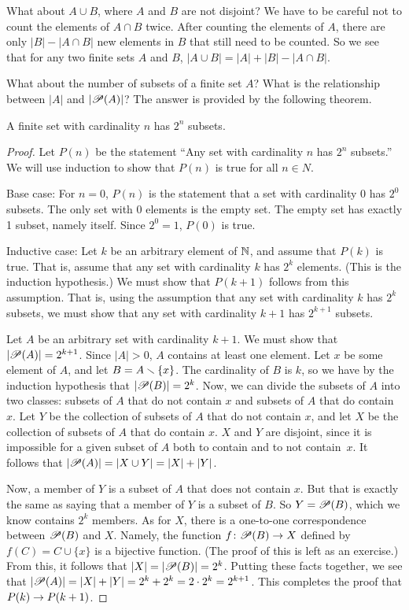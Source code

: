 What about $A\cup B$, where $A$ and $B$ are not disjoint?  We have to be
careful not to count the elements of $A\cap B$ twice.  After counting
the elements of $A$, there are only $|B|-|A\cap B|$ new elements in $B$ that
still need to be counted.  So we see that for any two finite sets $A$ and $B$,
$|A\cup B|=|A|+|B|-|A\cap B|$.

What about the number of subsets of a finite set $A$?  What is the relationship
between $|A|$ and $|{\mathscr P}(A)|$?  The answer is provided by the following theorem.

\begin{theorem}\label{T-subsetct}
A finite set with cardinality $n$  has $2^n$ subsets.
\end{theorem}
\begin{proof}
Let $P(n)$ be the statement ``Any set with cardinality $n$ has $2^n$
subsets.''  We will use induction to show that $P(n)$ is true
for all $n\in N$.

Base case:  For $n=0$, $P(n)$ is the statement that a set with
cardinality 0 has $2^0$ subsets.  The only set with 0 elements is
the empty set.  The empty set has exactly 1 subset, namely itself.
Since $2^0=1$, $P(0)$ is true.

Inductive case:  Let $k$ be an arbitrary element of ${\mathbb N}$, and
assume that $P(k)$ is true.  That is, assume that any set with
cardinality $k$ has $2^k$ elements.  (This is the induction
hypothesis.)  We must show that $P(k+1)$
follows from this assumption.  That is, using the assumption
that any set with cardinality $k$ has $2^k$ subsets, we must show that any
set with cardinality $k+1$ has $2^{k+1}$ subsets.

Let $A$ be an arbitrary set with cardinality $k+1$. 
We must show that $|{\mathscr P}(A)|=2^{k+1}$.   Since $|A|>0$,
$A$ contains at least one element.  Let $x$ be
some element of $A$, and let $B=A\smallsetminus\{x\}$.  The cardinality of
$B$ is $k$, so we have by the induction hypothesis that $|{\mathscr P}(B)|=2^k$.
Now, we can divide the subsets of $A$ into two classes: subsets of
$A$ that do not contain $x$ and subsets of $A$ that do contain $x$.
Let $Y$ be the collection of subsets of $A$ that do not contain $x$,
and let $X$ be the collection of subsets of $A$ that do contain $x$.
$X$ and $Y$ are disjoint, since it is impossible for a given subset
of $A$ both to contain and to not contain~$x$. It follows that
$|{\mathscr P}(A)|=|X\cup Y|=|X|+|Y|$.

Now, a member of $Y$ is a subset of $A$ that does not contain $x$.
But that is exactly the same as saying that a member of $Y$ is
a subset of $B$. So $Y={\mathscr P}(B)$, which we know contains $2^k$ members.
As for $X$, there is a one-to-one correspondence between ${\mathscr P}(B)$
and $X$.  Namely, the function $f\colon{\mathscr P}(B)\to X$ defined by
$f(C)=C\cup \{x\}$ is a bijective function.  (The proof of this
is left as an exercise.)  From this, it follows that
$|X|=|{\mathscr P}(B)|=2^k$.  Putting these facts together, we see that
$|{\mathscr P}(A)|=|X|+|Y|=2^k+2^k=2\cdot2^k=2^{k+1}$.  This completes the
proof that $P(k)\rightarrow P(k+1)$.
\end{proof}

